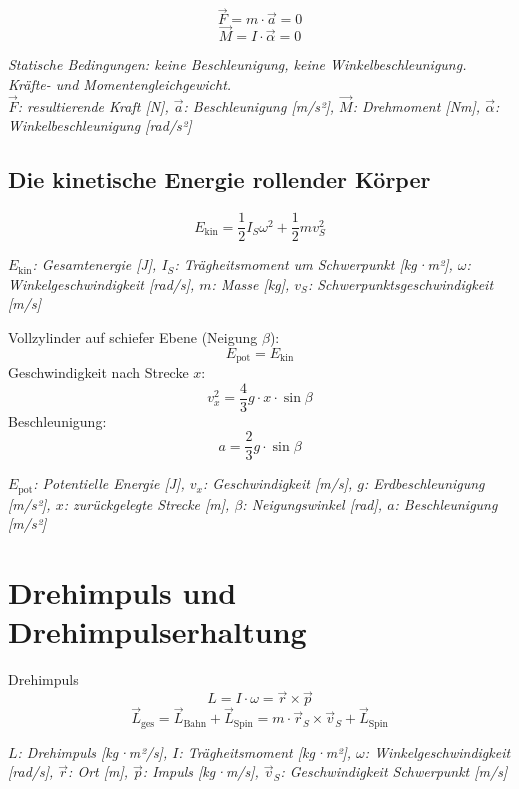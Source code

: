 \documentclass[a4paper,10pt]{article}
\newenvironment{displayformula}
{
	\begin{framed}
		\color{formulaColor}
	}
	{\end{framed}}
\newcommand{\formulalegend}[1]{%
	\par\vspace{0.5ex}%
	{{\color{legendColor}\RaggedRight\small\textit{#1}}}%
	\par\vspace{1.5ex}%
}
\begin{document}
\begin{displayformula}
	\[
	\vec{F} = m \cdot \vec{a} = 0
	\]
	\[
	\vec{M} = I \cdot \vec{\alpha} = 0
	\]
\end{displayformula}
\formulalegend{
	Statische Bedingungen: keine Beschleunigung, keine Winkelbeschleunigung. Kräfte- und Momentengleichgewicht.\\
	\( \vec{F} \): resultierende Kraft [N], \( \vec{a} \): Beschleunigung [m/s²], \( \vec{M} \): Drehmoment [Nm], \( \vec{\alpha} \): Winkelbeschleunigung [rad/s²]
}

\subsection{Die kinetische Energie rollender Körper}

\begin{displayformula}
	\[
	E_{\text{kin}} = \frac{1}{2} I_S \omega^2 + \frac{1}{2} m v_S^2
	\]
\end{displayformula}
\formulalegend{
	\( E_{\text{kin}} \): Gesamtenergie [J], \( I_S \): Trägheitsmoment um Schwerpunkt [kg·m²], \( \omega \): Winkelgeschwindigkeit [rad/s], \( m \): Masse [kg], \( v_S \): Schwerpunktsgeschwindigkeit [m/s]
}

\begin{displayformula}
	Vollzylinder auf schiefer Ebene (Neigung \( \beta \)):
	\[
	E_{\text{pot}} = E_{\text{kin}}
	\]
	Geschwindigkeit nach Strecke \( x \):
	\[
	v_x^2 = \frac{4}{3} g \cdot x \cdot \sin\beta
	\]
	Beschleunigung:
	\[
	a = \frac{2}{3} g \cdot \sin\beta
	\]
\end{displayformula}
\formulalegend{
	\( E_{\text{pot}} \): Potentielle Energie [J], \( v_x \): Geschwindigkeit [m/s], \( g \): Erdbeschleunigung [m/s²], \( x \): zurückgelegte Strecke [m], \( \beta \): Neigungswinkel [rad], \( a \): Beschleunigung [m/s²]
}

\section{Drehimpuls und Drehimpulserhaltung}

\begin{displayformula}
	Drehimpuls
	\[
	L = I \cdot \omega = \vec{r} \times \vec{p}
	\]
	\[
	\vec{L}_{\text{ges}} = \vec{L}_{\text{Bahn}} + \vec{L}_{\text{Spin}} = m \cdot \vec{r}_S \times \vec{v}_S + \vec{L}_{\text{Spin}}
	\]
\end{displayformula}
\formulalegend{
	\( L \): Drehimpuls [kg·m²/s], \( I \): Trägheitsmoment [kg·m²], \( \omega \): Winkelgeschwindigkeit [rad/s], \( \vec{r} \): Ort [m], \( \vec{p} \): Impuls [kg·m/s], \( \vec{v}_S \): Geschwindigkeit Schwerpunkt [m/s]
}
\end{document}
